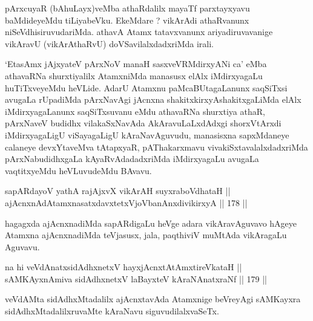 \begin{artha}
pArxcuyaR (bAhuLayx)veMba athaRdalilx mayaTf parxtayxyavu
baMdideyeMdu tiLiyabeVku. EkeMdare ? vikArAdi athaRvanunx
niSeVdhisiruvudariMda. athavA Atamx tatavxvanunx ariyadiruvavanige
vikAravU (vikArAthaRvU) doVSavilalxdadxriMda irali.
\end{artha}

\begin{artha}
`EtasAmx jAjxyateV pArxNoV manaH sasxveVRMdirxyANi ca' eMba athavaRNa shurxtiyalilx AtamxniMda manasusx elAlx
iMdirxyagaLu huTiTxveyeMdu heVLide. AdarU Atamxnu paMcaBUtagaLanunx
saqSiTxsi avugaLa rUpadiMda pArxNavAgi jAcnxna
shakitxkirxyAshakitxgaLiMda elAlx iMdirxyagaLanunx saqSiTxsuvanu
eMdu athavaRNa shurxtiya athaR, pArxNaveV budidhx vilakaSxNavAda
AkAravuLaLxdAdxgi shorxVtArxdi iMdirxyagaLigU viSayagaLigU
kAraNavAguvudu, manasisxna sapxMdaneye calaneye devxYtaveMva
tAtapxyaR, pAThakarxmavu vivakiSxtavalalxdadxriMda pArxNabudidhxgaLa
kAyaRvAdadadxriMda iMdirxyagaLu avugaLa vaqtitxyeMdu heVLuvudeMdu
BAvavu.
\end{artha}

\begin{shl}
sapARdayoV yathA rajAjxvX vikArAH suyxraboVdhataH || \\
ajAcnxnAdAtamxnasatxdavxtetxVjoVbanAnxdivikirxyA \hfill || 178 ||  
\end{shl}

\begin{artha}
hagagxda ajAcnxnadiMda sapARdigaLu heVge adara vikAravAguvavo hAgeye
Atamxna ajAcnxnadiMda teVjasusx, jala, paqthiviV muMtAda vikAragaLu
Aguvavu.
\end{artha}


\begin{shl}
na hi veVdAnatxsidAdhxnetxV hayxjAcnxtAtAmxtireVkataH || \\
sAMKAyxnAmiva sidAdhxnetxV laBayxteV kAraNAnatxraNf \hfill || 179 ||  
\end{shl}

\begin{artha}
veVdAMta sidAdhxMtadalilx ajAcnxtavAda Atamxnige beVreyAgi sAMKayxra
sidAdhxMtadalilxruvaMte kAraNavu siguvudilalxvaSeTx.
\end{artha}


